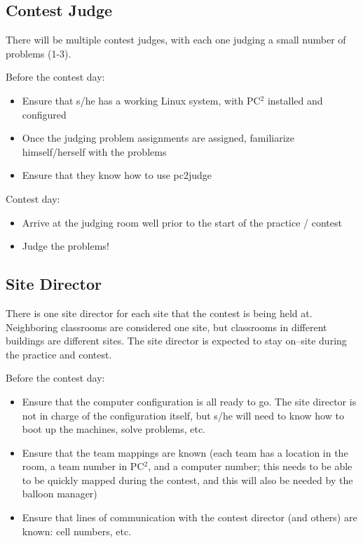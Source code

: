 \documentclass[11pt,twoside,letterpaper]{book}
\newenvironment{itemlist}{
\begin{itemize}
\setlength{\itemsep}{0pt}
\setlength{\parskip}{0pt}}
{\end{itemize}}
\begin{document}
\subsection{Contest Judge}

\noindent There will be multiple contest judges, with each one judging
a small number of problems (1-3).

\noindent Before the contest day:

\begin{itemlist}
\item Ensure that s/he has a working Linux system, with PC$^2$
installed and configured
\item Once the judging problem assignments are assigned, familiarize
  himself/herself with the problems
\item Ensure that they know how to use pc2judge
\end{itemlist}

\noindent Contest day:

\begin{itemlist}
\item Arrive at the judging room well prior to the start of the
  practice / contest
\item Judge the problems!
\end{itemlist}


\subsection{Site Director}

\noindent There is one site director for each site that the contest is
being held at.  Neighboring classrooms are considered one site, but
classrooms in different buildings are different sites.  The site
director is expected to stay on--site during the practice and contest.

\noindent Before the contest day:

\begin{itemlist}
\item Ensure that the computer configuration is all ready to go.  The
  site director is not in charge of the configuration itself, but s/he
  will need to know how to boot up the machines, solve problems, etc.
\item Ensure that the team mappings are known (each team has a
  location in the room, a team number in PC$^2$, and a computer
  number; this needs to be able to be quickly mapped during the
  contest, and this will also be needed by the balloon manager)
\item Ensure that lines of communication with the contest director
  (and others) are known: cell numbers, etc.
\end{itemlist}
\end{document}
